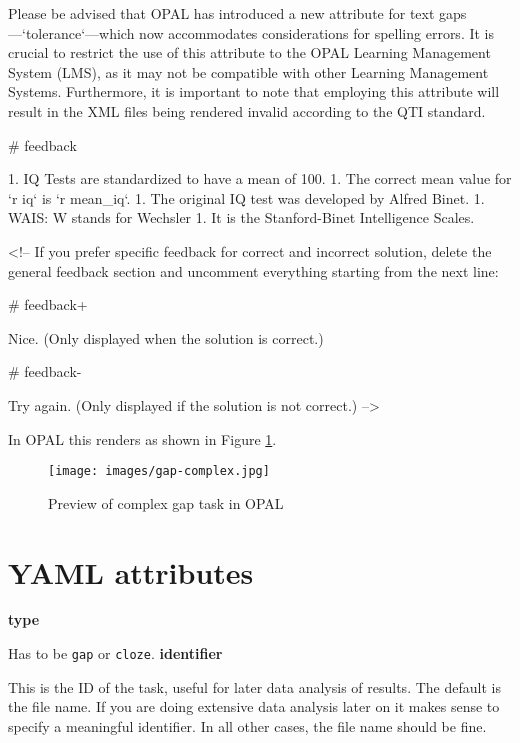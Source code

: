 \documentclass[twoside]{tufte-book}
\newenvironment{Shaded}{}{}
\begin{document}
\begin{Shaded}
\begin{Highlighting}
Please be advised that OPAL has introduced a new attribute for text
gaps—`tolerance`—which now accommodates considerations for spelling errors. It
is crucial to restrict the use of this attribute to the OPAL Learning Management
System (LMS), as it may not be compatible with other Learning Management
Systems. Furthermore, it is important to note that employing this attribute will
result in the XML files being rendered invalid according to the QTI standard.

# feedback

1. IQ Tests are standardized to have a mean of 100.
1. The correct mean value for `r iq` is `r mean_iq`.
1. The original IQ test was developed by Alfred Binet.
1. WAIS: W stands for Wechsler
1. It is the Stanford-Binet Intelligence Scales.

<!-- If you prefer specific feedback for correct and incorrect solution, delete
the general feedback section and uncomment everything starting from the next
line:

# feedback+

Nice. (Only displayed when the solution is correct.)

# feedback-

Try again. (Only displayed if the solution is not correct.)
-->
\end{Highlighting}
\end{Shaded}

In OPAL this renders as shown in Figure \ref{gap2opal}.

\begin{figure}
\centering
\texttt{[image: images/gap-complex.jpg]}
\caption{\label{gap2opal}Preview of complex gap task in OPAL}
\end{figure}

\section{YAML attributes}\label{YAML-attributes-2}

\noindent\textbf{type}\label{type-2}

Has to be \texttt{gap} or \texttt{cloze}.
\newpage
\noindent\textbf{identifier}\label{identifier-2}

This is the ID of the task, useful for later data analysis of results. The default is the file name. If you are doing extensive data analysis later on it makes sense to
specify a meaningful identifier. In all other cases, the file name should be
fine.
\end{document}
